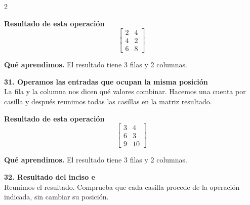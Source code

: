 \documentclass[11pt,a4paper,landscape]{article}
\begin{document}
\begin{multicols*}{2}
\begin{minipage}{\linewidth}
\par\smallskip \textbf{Resultado de esta operación}\[\begin{bmatrix}2 & 4\\4 & 2\\6 & 8\end{bmatrix}\]
\par\smallskip\textbf{Qué aprendimos.} El resultado tiene 3 filas y 2 columnas.
\end{minipage}\par\medskip
\noindent\begin{minipage}{\linewidth}\textbf{31. Operamos las entradas que ocupan la misma posición}\\[2pt]La fila y la columna nos dicen qué valores combinar. Hacemos una cuenta por casilla y después reunimos todas las casillas en la matriz resultado.
\par{}\par\smallskip
\par\smallskip \textbf{Resultado de esta operación}\[\begin{bmatrix}3 & 4\\6 & 3\\9 & 10\end{bmatrix}\]
\par\smallskip\textbf{Qué aprendimos.} El resultado tiene 3 filas y 2 columnas.
\end{minipage}\par\medskip
\noindent\begin{minipage}{\linewidth}\textbf{32. Resultado del inciso e}\\[2pt]Reunimos el resultado. Comprueba que cada casilla procede de la operación indicada, sin cambiar su posición.

\end{minipage}
\end{multicols*}
\end{document}
